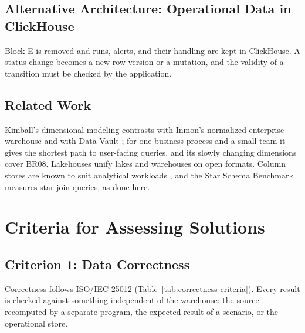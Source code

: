 \documentclass[peerreview]{IEEEtran}
\begin{document}
\subsection{Alternative Architecture: Operational Data in ClickHouse}
\label{sec:sol-ops}
Block E is removed and runs, alerts, and their handling are kept in ClickHouse. A status
change becomes a new row version or a mutation, and the validity of a transition must be
checked by the application.

\subsection{Related Work}
Kimball's dimensional modeling \cite{kimball2013} contrasts with Inmon's normalized
enterprise warehouse \cite{inmon2005} and with Data Vault \cite{linstedt2015}; for one
business process and a small team it gives the shortest path to user-facing queries, and its
slowly changing dimensions cover BR08. Lakehouses \cite{armbrust2021lakehouse} unify lakes and
warehouses on open formats. Column stores are known to suit analytical workloads
\cite{stonebraker2005cstore,abadi2008column}, and the Star Schema Benchmark
\cite{oneil2009ssb} measures star-join queries, as done here.


\section{Criteria for Assessing Solutions}
\label{sec:criteria}

\subsection{Criterion 1: Data Correctness}
Correctness follows ISO/IEC 25012 \cite{iso25012} (Table~\ref{tab:correctness-criteria}).
Every result is checked against something independent of the warehouse: the source
recomputed by a separate program, the expected result of a scenario, or the operational
store.
\end{document}
